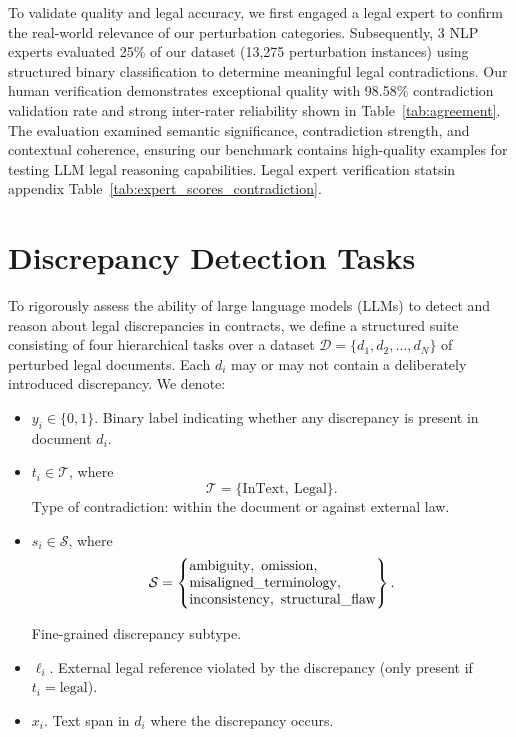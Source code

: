 \documentclass[11pt]{article}
\begin{document}
To validate quality and legal accuracy, we first engaged a legal expert to confirm the real-world relevance of our perturbation categories. Subsequently, 3 NLP experts evaluated 25\% of our dataset (13,275 perturbation instances) using structured binary classification to determine meaningful legal contradictions. Our human verification demonstrates exceptional quality with 98.58\% contradiction validation rate and strong inter-rater reliability shown in Table~\ref{tab:agreement}. The evaluation examined semantic significance, contradiction strength, and contextual coherence, ensuring our benchmark contains high-quality examples for testing LLM legal reasoning capabilities. Legal expert verification statsin appendix Table~\ref{tab:expert_scores_contradiction}.

\section{Discrepancy Detection Tasks}\label{sec:tasks}

To rigorously assess the ability of large language models (LLMs) to detect and reason about legal discrepancies in contracts, we define a structured suite consisting of four hierarchical tasks over a dataset $\mathcal{D} = \{d_1, d_2, \dots, d_N\}$ of perturbed legal documents. Each $d_i$ may or may not contain a deliberately introduced discrepancy. We denote:
\begin{itemize}[leftmargin=*,itemsep=0.1em]
\item $y_i \in \{0, 1\}$. Binary label indicating whether any discrepancy is present in document $d_i$.
    
    \item $t_i \in \mathcal{T}$, where
    {
    \small
    \[
    \mathcal{T} = \{\mathrm{InText},\ \mathrm{Legal}\}.
    \]
    Type of contradiction: within the document or against external law.
    }
    \item $s_i \in \mathcal{S}$, where
    {
    \small
    \[
    \mathcal{S}
    = \left\{
    \begin{array}{@{}l@{}}
    \mathrm{ambiguity},\ \mathrm{omission},\\
    \mathrm{misaligned\_terminology},\\
    \mathrm{inconsistency},\ \mathrm{structural\_flaw}
    \end{array}
    \right\}.
    \]
    }


    Fine-grained discrepancy subtype.
    
    \item $\ell_i$. External legal reference violated by the discrepancy (only present if $t_i = \mathrm{legal}$).
    
    \item $x_i$. Text span in $d_i$ where the discrepancy occurs.
\end{itemize}
\end{document}
